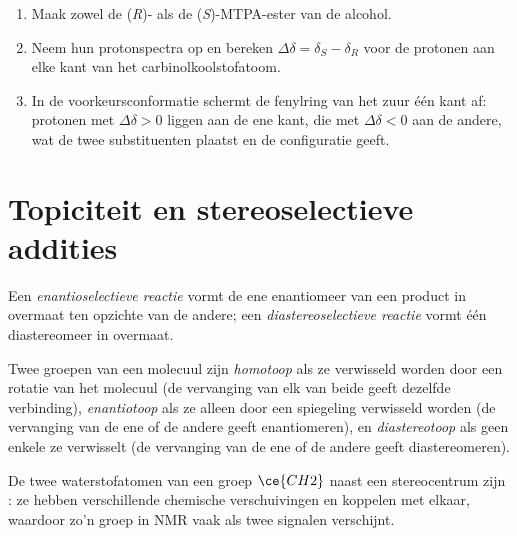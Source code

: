 \begin{method}\label{met:b3:asymmetric-synthesis:mosher}
\begin{enumerate}
  \item Maak zowel de (\textit{R})- als de (\textit{S})-MTPA-ester van de alcohol.
  \item Neem hun protonspectra op en bereken $\Delta\delta = \delta_S - \delta_R$ voor de protonen aan elke
        kant van het carbinolkoolstofatoom.
  \item In de voorkeursconformatie schermt de fenylring van het zuur één
        kant af:
        protonen met $\Delta\delta > 0$ liggen aan de ene kant, die met $\Delta\delta < 0$ aan de andere, wat
        de twee substituenten plaatst en de configuratie geeft.
\end{enumerate}
\end{method}

\section{Topiciteit en stereoselectieve addities}

\begin{definition}\label{def:b3:asymmetric-synthesis:selective}
Een \emph{enantioselectieve reactie} vormt
de ene enantiomeer van een product in overmaat ten opzichte van de
andere; een \emph{diastereoselectieve
reactie} vormt één diastereomeer in
overmaat.
\end{definition}

\begin{definition}[Topiciteit]\label{def:b3:asymmetric-synthesis:topicity}
Twee groepen van een molecuul zijn \emph{homotoop} als ze
verwisseld worden door een rotatie van het molecuul (de vervanging van
elk van beide geeft dezelfde verbinding),
\emph{enantiotoop} als ze alleen door een spiegeling
verwisseld worden (de vervanging van de ene of de andere geeft
enantiomeren), en
\emph{diastereotoop} als geen enkele
 ze verwisselt (de vervanging van de ene of de andere
geeft diastereomeren).
\end{definition}

De twee waterstofatomen van een groep $\ce{CH2}$ naast een stereocentrum zijn : ze
hebben verschillende chemische verschuivingen en koppelen met elkaar,
waardoor zo'n groep in NMR vaak als twee signalen verschijnt.

